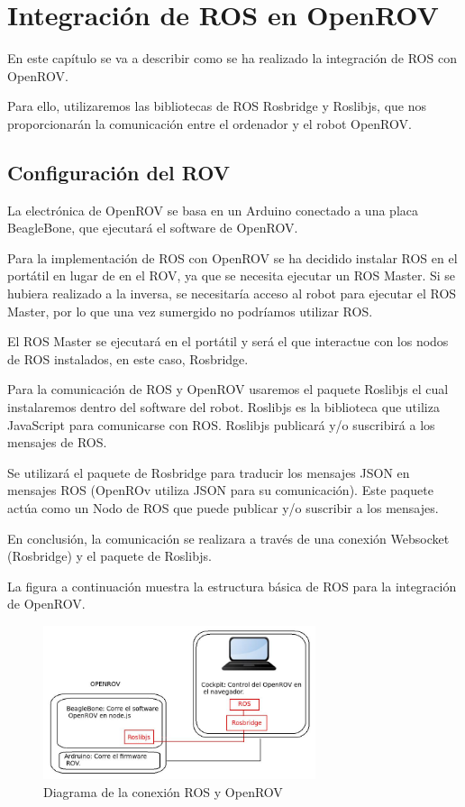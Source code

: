 \chapter{Integración de ROS en OpenROV}
\label{cap:integracionROS}

En este capítulo se va a describir como se ha realizado la integración de ROS con OpenROV\cite{ros_rov}.

Para ello, utilizaremos las bibliotecas de ROS Rosbridge y Roslibjs, que nos proporcionarán la comunicación entre el ordenador y el robot OpenROV.

\section{Configuración del ROV}
\label{cap:Configuracion del ROV}
La electrónica de OpenROV se basa en un Arduino conectado a una placa BeagleBone, que ejecutará el software de OpenROV.

Para la implementación de ROS con OpenROV se ha decidido instalar ROS en el portátil en lugar de en el ROV, ya que se necesita ejecutar un ROS Master. Si se hubiera realizado a la inversa, se necesitaría acceso al robot para ejecutar el ROS Master, por lo que una vez sumergido no podríamos utilizar ROS.

El ROS Master se ejecutará en el portátil y será el que interactue con los nodos de ROS instalados, en este caso, Rosbridge.

Para la comunicación de ROS y OpenROV usaremos el paquete Roslibjs el cual instalaremos dentro del software del robot. Roslibjs es la biblioteca que utiliza JavaScript para comunicarse con ROS. Roslibjs publicará y/o suscribirá a los mensajes de ROS.

Se utilizará el paquete de Rosbridge para traducir los mensajes JSON en mensajes ROS (OpenROv utiliza JSON para su comunicación). Este paquete actúa como un Nodo de ROS que puede publicar y/o suscribir a los mensajes.

En conclusión, la comunicación se realizara a través de una conexión Websocket (Rosbridge) y el paquete de Roslibjs.

La figura a continuación muestra la estructura básica de ROS para la integración de OpenROV.

\begin{figure} [hbtp]
  \begin{center}
    \includegraphics[width=8cm]{img/cap4/conect_ros_rov}
  \end{center}
  \caption{Diagrama de la conexión ROS y OpenROV}
  \label{fig:conect_ros_rov}
\end{figure}

